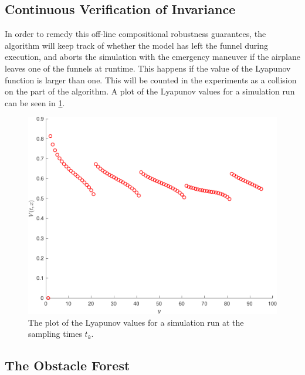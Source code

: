 \subsection{Continuous Verification of Invariance}
\label{subsec:check-vehicle-in-funnel}

In order to remedy this off-line compositional robustness guarantees, the
\rrtfunnel{} algorithm will keep track of whether the model has left the funnel
during execution, and aborts the simulation with the emergency maneuver if the
airplane leaves one of the funnels at runtime. This happens if the value of the
Lyapunov function is larger than one. This will be counted in the experiments as
a collision on the part of the \rrtfunnel{} algorithm. A plot of the Lyapunov
values for a simulation run can be seen in \cref{fig:lyapunov-values}.

\begin{figure}[!t]
  \centering
  \includegraphics[width=.8\columnwidth]{figures/experiments/lyapunov-values-simulation-run}
  \caption[A plot of the Lyapunov values for an experiment]{The plot of the Lyapunov values for a simulation run at the sampling
    times \(t_k\).}
  \label{fig:lyapunov-values}
\end{figure}

\subsection{The Obstacle Forest}
\label{sec:Poisson-Process}

